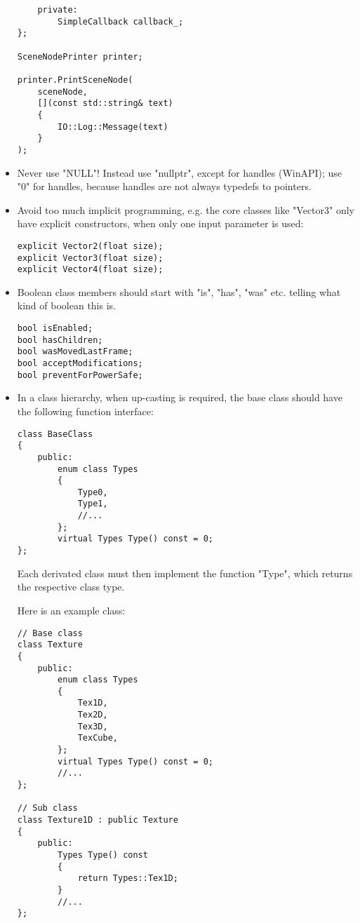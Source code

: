\documentclass{article}
\begin{document}
\begin{itemize}
\begin{lstlisting}
	private:
		SimpleCallback callback_;
};

SceneNodePrinter printer;

printer.PrintSceneNode(
	sceneNode,
	[](const std::string& text)
	{
		IO::Log::Message(text)
	}
);
\end{lstlisting}

\item
Never use "NULL"! Instead use "nullptr", except for handles (WinAPI); use "0" for handles, because handles are not always typedefs to pointers.

\item
Avoid too much implicit programming, e.g. the core classes like "Vector3" only have explicit constructors, when only one input parameter is used:

\begin{lstlisting}
explicit Vector2(float size);
explicit Vector3(float size);
explicit Vector4(float size);
\end{lstlisting}

\item
Boolean class members should start with "is", "has", "was" etc. telling what kind of boolean this is.

\begin{lstlisting}
bool isEnabled;
bool hasChildren;
bool wasMovedLastFrame;
bool acceptModifications;
bool preventForPowerSafe;
\end{lstlisting}

\item
In a class hierarchy, when up-casting is required, the base class should have the following function interface:

\begin{lstlisting}
class BaseClass
{
	public:
		enum class Types
		{
			Type0,
			Type1,
			//...
		};
		virtual Types Type() const = 0;
};
\end{lstlisting}

Each derivated class must then implement the function "Type", which returns the respective class type.

Here is an example class:

\begin{lstlisting}
// Base class
class Texture
{
	public:
		enum class Types
		{
			Tex1D,
			Tex2D,
			Tex3D,
			TexCube,
		};
		virtual Types Type() const = 0;
		//...
};

// Sub class
class Texture1D : public Texture
{
	public:
		Types Type() const
		{
			return Types::Tex1D;
		}
		//...
};
\end{lstlisting}


\end{itemize}
\end{document}

